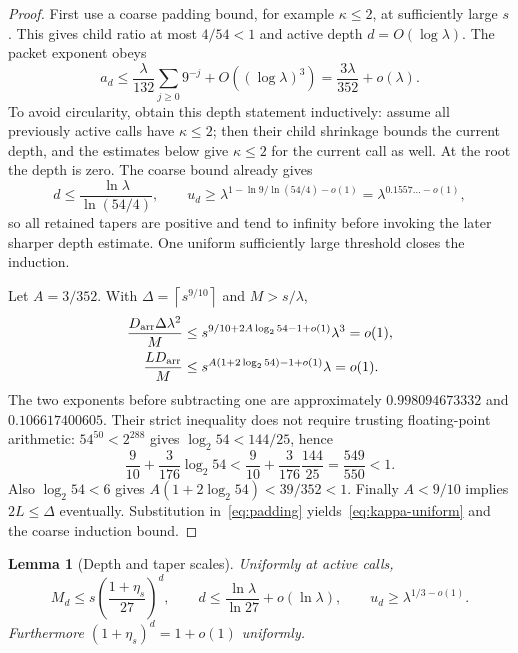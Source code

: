 \documentclass[11pt,letterpaper]{article}
\numberwithin{equation}{section}
\newtheorem{lemma}[theorem]{Lemma}
\theoremstyle{definition}\newtheorem{definition}[theorem]{Definition}
\theoremstyle{remark}\newtheorem{remark}[theorem]{Remark}
\newcommand{\ceil}[1]{\left\lceil #1\right\rceil}
\begin{document}
\begin{proof}
First use a coarse padding bound, for example $\kappa\le2$, at sufficiently large $s$. This gives child ratio at most $4/54<1$ and active depth $d=O(\log\lambda)$. The packet exponent obeys
\begin{equation}\label{eq:amax}
 a_d\le\frac{\lambda}{132}\sum_{j\ge0}9^{-j}
             +O((\log\lambda)^3)
      =\frac{3\lambda}{352}+o(\lambda).
\end{equation}
To avoid circularity, obtain this depth statement inductively: assume all previously active calls have $\kappa\le2$; then their child shrinkage bounds the current depth, and the estimates below give $\kappa\le2$ for the current call as well. At the root the depth is zero. The coarse bound already gives
\[
 d\le\frac{\ln\lambda}{\ln(54/4)},\qquad
 u_d\ge\lambda^{1-\ln9/\ln(54/4)-o(1)}
       =\lambda^{0.1557\ldots-o(1)},
\]
so all retained tapers are positive and tend to infinity before invoking the later sharper depth estimate. One uniform sufficiently large threshold closes the induction.

Let $A=3/352$. With $\Delta=\ceil{s^{9/10}}$ and $M>s/\lambda$,
\begin{align}
 \frac{D_{\rm arr}\Delta\lambda^2}{M}
 &\le s^{9/10+2A\log_2 54-1+o(1)}\lambda^3=o(1),\label{eq:criticalmargin}\\
 \frac{LD_{\rm arr}}M
 &\le s^{A(1+2\log_2 54)-1+o(1)}\lambda=o(1).
\end{align}
The two exponents before subtracting one are approximately $0.998094673332$ and $0.106617400605$. Their strict inequality does not require trusting floating-point arithmetic: $54^{50}<2^{288}$ gives $\log_2 54<144/25$, hence
\[
 \frac9{10}+\frac3{176}\log_2 54
 <\frac9{10}+\frac3{176}\frac{144}{25}
 =\frac{549}{550}<1.
\]
Also $\log_2 54<6$ gives $A(1+2\log_2 54)<39/352<1$. Finally $A<9/10$ implies $2L\le\Delta$ eventually. Substitution in~\eqref{eq:padding} yields~\eqref{eq:kappa-uniform} and the coarse induction bound.
\end{proof}

\begin{lemma}[Depth and taper scales]\label{lem:depth}
Uniformly at active calls,
\begin{equation}\label{eq:depth}
 M_d\le s\left(\frac{1+\eta_s}{27}\right)^d,
 \qquad d\le\frac{\ln\lambda}{\ln27}+o(\ln\lambda),
 \qquad u_d\ge\lambda^{1/3-o(1)}.
\end{equation}
Furthermore $(1+\eta_s)^d=1+o(1)$ uniformly.
\end{lemma}
\end{document}
